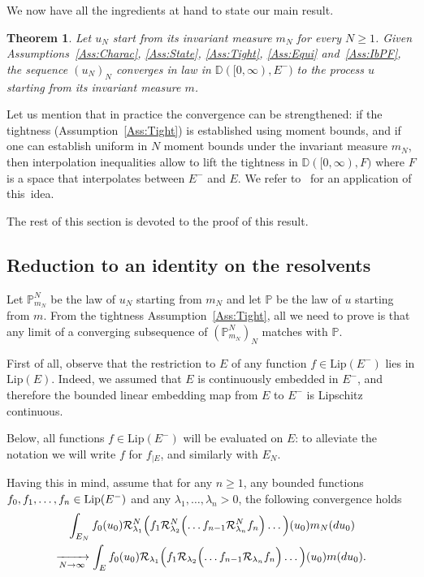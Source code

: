 \documentclass[10pt]{amsart}
\newtheorem{theo}{Theorem}[section]
\theoremstyle{definition}\newtheorem{defi}[theo]{Definition}\newtheorem{rema}[theo]{Remark}\newtheorem{exam}[theo]{Example}\newtheorem{exem}[theo]{Example}\newtheorem{nota}[theo]{Notation}
\theoremstyle{plain}
\newcommand{\bbD}{\mathbb{D}}
\newcommand{\bbP}{\mathbb{P}}
\newcommand{\cR}{\mathcal{R}}
\newcommand*\Lip{\mathrm{Lip}}
\renewcommand*{\to}{\mathchoice{\longrightarrow}{\rightarrow}{\rightarrow}{\rightarrow}}
\begin{document}
We now have all the ingredients at hand to state our main result.


\begin{theo}\label{Th:BlackBox}
Let $u_N$ start from its invariant measure $m_N$ for every $N\ge 1$. Given Assumptions~\ref{Ass:Charac}, \ref{Ass:State}, \ref{Ass:Tight}, \ref{Ass:Equi} and~\ref{Ass:IbPF}, the sequence $(u_N)_N$ converges in law in $\bbD([0,\infty), E^{-})$ to the process $u$ starting from its invariant measure $m$.
\end{theo}


Let us mention that in practice the convergence can be strengthened: if the tightness (Assumption~\ref{Ass:Tight}) is established using moment bounds, and if one can establish uniform in $N$ moment bounds under the invariant measure $m_N$, then interpolation inequalities allow to lift the tightness in $\bbD([0,\infty), F)$ where $F$ is a space that interpolates between $E^-$ and $E$. We refer to~\cite[Lemma~5.2]{DebZam} for an application of this~idea.


The rest of this section is devoted to the proof of this result.

\subsection{Reduction to an identity on the resolvents}\label{Subsec:Reduction}

Let $\bbP_{m_N}^{N}$ be the law of $u_N$ starting from $m_N$ and let $\bbP$ be the law of $u$ starting from $m$. From the tightness Assumption~\ref{Ass:Tight}, all we need to prove is that any limit of a converging subsequence of $(\bbP_{m_N}^{N})_N$ matches with $\bbP$.

First of all, observe that the restriction to $E$ of any function $f \in \Lip(E^-)$ lies in $\Lip(E)$. Indeed, we assumed that $E$ is continuously embedded in $E^-$, and therefore the bounded linear embedding map from $E$ to $E^-$ is Lipschitz continuous.

Below, all functions $f\in \Lip(E^-)$ will be evaluated on $E$: to alleviate the notation we will write $f$ for $f_{\mid E}$, and similarly with $E_N$.

Having this in mind, assume that for any $n\geq 1$, any bounded functions $f_0,f_1,\dots,\linebreak f_n\in\Lip(E^-)$ and any $\lambda_1,\dots,\lambda_n >0$, the following convergence holds
\begin{multline}\label{Eq:RecurResolv}
{}\int_{E_N} f_0(u_0)\cR^N_{\lambda_1} \Bigl(f_1\cR^N_{\lambda_2} \Bigl(\dots f_{n-1} \cR^N_{\lambda_n} f_n\Bigr)\dots\Bigr) (u_0) m_N(du_0)\\
\xrightarrow[N\to\infty]{}
\int_{E} f_0(u_0)\cR_{\lambda_1} \Bigl(f_1\cR_{\lambda_2} \Bigl(\dots f_{n-1} \cR_{\lambda_n} f_n\Bigr)\dots\Bigr) (u_0) m(du_0).
\end{multline}
\end{document}

